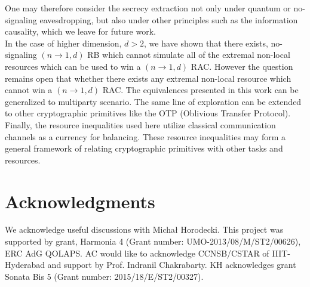 \documentclass[%
 reprint,
 amsmath,amssymb,
 aps,
]{revtex4-1}
\begin{document}

One may therefore
consider the secrecy extraction not only under quantum or no-signaling eavesdropping, but also under other principles such as the information causality, which
we leave for future work.\\      
In the case of higher dimension, $d>2$, we have shown that there exists, no-signaling $(n\rightarrow1,d)$ RB which cannot simulate all of the extremal non-local resources which can be used to win a $(n\rightarrow1,d)$ RAC. However the question remains open that whether there exists any extremal non-local resource which cannot win a $(n\rightarrow1,d)$ RAC. 
The equivalences presented in this work can be generalized to multiparty scenario. The same line of exploration can be extended to other cryptographic primitives like the OTP (Oblivious Transfer Protocol).
Finally, the resource inequalities used here utilize classical communication channels as a currency for balancing. These resource inequalities may form a general framework of relating cryptographic primitives with other tasks and resources. 
 
\section{Acknowledgments}
We acknowledge useful discussions with Micha{\l} Horodecki.
This project was supported by grant, Harmonia 4 (Grant number: UMO-2013/08/M/ST2/00626), ERC AdG QOLAPS. AC would like to acknowledge CCNSB/CSTAR of IIIT-Hyderabad and  support by Prof. Indranil Chakrabarty. KH acknowledges grant Sonata Bis 5 (Grant number: 2015/18/E/ST2/00327).

\clearpage

\end{document}
